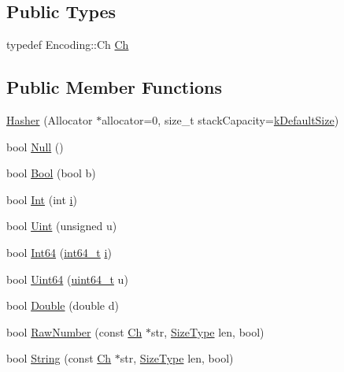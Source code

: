 \subsection*{Public Types}
\begin{DoxyCompactItemize}
\item 
typedef Encoding\+::\+Ch \hyperlink{classinternal_1_1Hasher_a415970af68a067615c3c95306cff6d43}{Ch}
\end{DoxyCompactItemize}
\subsection*{Public Member Functions}
\begin{DoxyCompactItemize}
\item 
\hyperlink{classinternal_1_1Hasher_a7b6abfdd3bdc60064a2322cdd20708c1}{Hasher} (Allocator $\ast$allocator=0, size\+\_\+t stack\+Capacity=\hyperlink{classinternal_1_1Hasher_a0a07e0306af8d4a3a87e88423c9e47a7}{k\+Default\+Size})
\item 
bool \hyperlink{classinternal_1_1Hasher_a57c656866aa08cc7c448ce47b7a243c3}{Null} ()
\item 
bool \hyperlink{classinternal_1_1Hasher_a11efd784a4e9c4f8a3dc281552df0486}{Bool} (bool b)
\item 
bool \hyperlink{classinternal_1_1Hasher_aadbadf98ee7c9ab03a636e0f06d38bac}{Int} (int \hyperlink{game__play__state_8cpp_acb559820d9ca11295b4500f179ef6392}{i})
\item 
bool \hyperlink{classinternal_1_1Hasher_a4401600c24c817a45cea6c281438e5b4}{Uint} (unsigned u)
\item 
bool \hyperlink{classinternal_1_1Hasher_ae0579cd54b3c545f77452543793b9a97}{Int64} (\hyperlink{stdint_8h_a414156feea104f8f75b4ed9e3121b2f6}{int64\+\_\+t} \hyperlink{game__play__state_8cpp_acb559820d9ca11295b4500f179ef6392}{i})
\item 
bool \hyperlink{classinternal_1_1Hasher_a14832ac4ec204f1065b929df2c255457}{Uint64} (\hyperlink{stdint_8h_aec6fcb673ff035718c238c8c9d544c47}{uint64\+\_\+t} u)
\item 
bool \hyperlink{classinternal_1_1Hasher_a83abe847e24ed88d5aab092d840e37c1}{Double} (double d)
\item 
bool \hyperlink{classinternal_1_1Hasher_ae277289ad2fb3a938a6507e566d3c5e2}{Raw\+Number} (const \hyperlink{classinternal_1_1Hasher_a415970af68a067615c3c95306cff6d43}{Ch} $\ast$str, \hyperlink{rapidjson_8h_a5ed6e6e67250fadbd041127e6386dcb5}{Size\+Type} len, bool)
\item 
bool \hyperlink{classinternal_1_1Hasher_a885f2bf42f2bb64d6f9443129dce3883}{String} (const \hyperlink{classinternal_1_1Hasher_a415970af68a067615c3c95306cff6d43}{Ch} $\ast$str, \hyperlink{rapidjson_8h_a5ed6e6e67250fadbd041127e6386dcb5}{Size\+Type} len, bool)

\end{DoxyCompactItemize}
